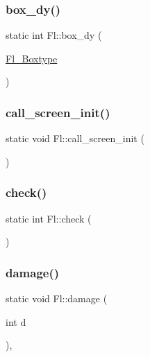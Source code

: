 \subsubsection{\texorpdfstring{box\+\_\+dy()}{box\_dy()}}
{\footnotesize\ttfamily static int Fl\+::box\+\_\+dy (\begin{DoxyParamCaption}\item[{\hyperlink{_enumerations_8_h_ae48bf9070f8541de17829f54ccacc6bc}{Fl\+\_\+\+Boxtype}}]{ }\end{DoxyParamCaption})\hspace{0.3cm}{\ttfamily [static]}}

\mbox{\label{class_fl_ae5d5f242d5b6b79b761c12ba02df28dd}} 
\subsubsection{\texorpdfstring{call\+\_\+screen\+\_\+init()}{call\_screen\_init()}}
{\footnotesize\ttfamily static void Fl\+::call\+\_\+screen\+\_\+init (\begin{DoxyParamCaption}{ }\end{DoxyParamCaption})\hspace{0.3cm}{\ttfamily [static]}}

\mbox{\label{class_fl_a617f0e5fd20e8d143a50fbc2e92c8495}} 
\subsubsection{\texorpdfstring{check()}{check()}}
{\footnotesize\ttfamily static int Fl\+::check (\begin{DoxyParamCaption}{ }\end{DoxyParamCaption})\hspace{0.3cm}{\ttfamily [static]}}

\mbox{\label{class_fl_a45391ff5a25464a6e40658b58bf3ef98}} 
\subsubsection{\texorpdfstring{damage()}{damage()}\hspace{0.1cm}{\footnotesize\ttfamily [1/2]}}
{\footnotesize\ttfamily static void Fl\+::damage (\begin{DoxyParamCaption}\item[{int}]{d }\end{DoxyParamCaption})\hspace{0.3cm}{\ttfamily [inline]}, {\ttfamily [static]}}

